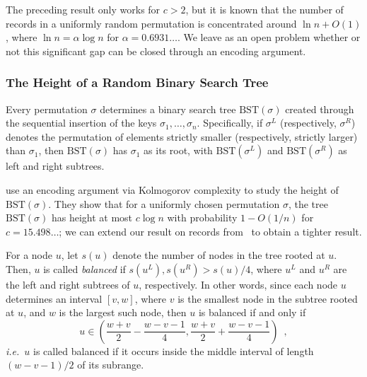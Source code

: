 \documentclass[format=acmsmall, review=false, screen=true]{acmart}
\begin{document}
\begin{rem}
  The preceding result only works for $c > 2$, but it is  known
  that the number of records in a uniformly random permutation is
  concentrated around $\ln n + O(1)$, where $\ln n = \alpha \log n$
  for $\alpha = 0.6931\dots$. We leave as an open problem whether or not
  this significant gap can be closed through an encoding argument.
\end{rem}

\subsubsection{The Height of a Random Binary Search Tree}

Every permutation $\sigma$ determines a binary search tree
$\text{BST}(\sigma)$ created through the sequential insertion of the
keys $\sigma_1, \ldots, \sigma_n$. Specifically, if $\sigma^L$
(respectively, $\sigma^R$) denotes the permutation of elements
strictly smaller (respectively, strictly larger) than $\sigma_1$, then
$\text{BST}(\sigma)$ has $\sigma_1$ as its root, with
$\text{BST}(\sigma^L)$ and $\text{BST}(\sigma^R)$ as left and right
subtrees.

 use an encoding
argument via Kolmogorov complexity to study the height of
$\text{BST}(\sigma)$. They show that for a uniformly chosen
permutation $\sigma$, the tree $\text{BST}(\sigma)$ has height at most
$c \log n$ with probability $1 - O(1/n)$ for $c = 15.498\dots$; we can
extend our result on records from~ to obtain a 
tighter result.

For a node $u$, let $s(u)$ denote the number of nodes in the tree
rooted at $u$. Then, $u$ is called \emph{balanced} if
$s(u^L), s(u^R) > s(u)/4$, where $u^L$ and $u^R$ are the left and
right subtrees of $u$, respectively. In other words, since each node
$u$ determines an interval $[v, w]$, where $v$ is the smallest node in
the subtree rooted at $u$, and $w$ is the largest such node, then $u$
is balanced if and only if
\[
  u \in \left(\frac{w + v}{2} - \frac{w - v - 1}{4}, \frac{w + v}{2} + \frac{w - v - 1}{4}\right) \enspace ,
\]
\emph{i.e.}~$u$ is called balanced if it occurs inside the middle interval
of length $(w - v - 1)/2$ of its subrange.
\end{document}
